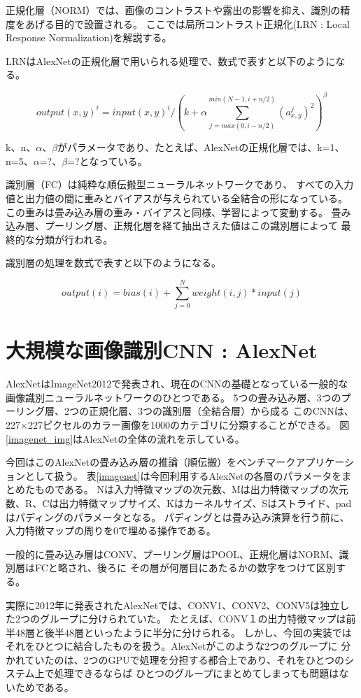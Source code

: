 正規化層（NORM）では、画像のコントラストや露出の影響を抑え、識別の精度をあげる目的で設置される。
ここでは局所コントラスト正規化(LRN : Local Response Normalization)を解説する。

LRNはAlexNetの正規化層で用いられる処理で、数式で表すと以下のようになる。

\[
  output(x, y)^{i} = input(x, y)^{i} / (k + \alpha \sum_{j=max(0, i-n/2)}^{min(N-1, i+n/2)} (a^j_{x, y})^2)^\beta
\]

k、n、$\alpha$、$\beta$がパラメータであり、たとえば、AlexNetの正規化層では、k=1、n=5、$\alpha$=?、$\beta$=?となっている。

識別層（FC）は純粋な順伝搬型ニューラルネットワークであり、
すべての入力値と出力値の間に重みとバイアスが与えられている全結合の形になっている。
この重みは畳み込み層の重み・バイアスと同様、学習によって変動する。
畳み込み層、プーリング層、正規化層を経て抽出さえた値はこの識別層によって
最終的な分類が行われる。

識別層の処理を数式で表すと以下のようになる。

\[
  output(i) = bias(i) + \sum_{j=0}^{N} weight(i, j) * input(j)
\]

\section{大規模な画像識別CNN : AlexNet}
AlexNet\cite{alexnet}はImageNet2012で発表され、現在のCNNの基礎となっている一般的な
画像識別ニューラルネットワークのひとつである。
5つの畳み込み層、3つのプーリング層、2つの正規化層、3つの識別層（全結合層）から成る
このCNNは、227×227ピクセルのカラー画像を1000のカテゴリに分類することができる。
図\ref{imagenet_img}はAlexNetの全体の流れを示している。

今回はこのAlexNetの畳み込み層の推論（順伝搬）をベンチマークアプリケーションとして扱う。
表\ref{imagenet}は今回利用するAlexNetの各層のパラメータをまとめたものである。
Nは入力特徴マップの次元数、Mは出力特徴マップの次元数、R、Cは出力特徴マップサイズ、Kはカーネルサイズ、Sはストライド、padはパディングのパラメータとなる。
パディングとは畳み込み演算を行う前に、入力特徴マップの周りを0で埋める操作である。

一般的に畳み込み層はCONV、プーリング層はPOOL、正規化層はNORM、識別層はFCと略され、後ろに
その層が何層目にあたるかの数字をつけて区別する。

実際に2012年に発表されたAlexNetでは、CONV1、CONV2、CONV5は独立した2つのグループに分けられていた。
たとえば、CONV１の出力特徴マップは前半48層と後半48層といったように半分に分けられる。
しかし、今回の実装ではそれをひとつに結合したものを扱う。AlexNetがこのような2つのグループに
分かれていたのは、2つのGPUで処理を分担する都合上であり、それをひとつのシステム上で処理できるならば
ひとつのグループにまとめてしまっても問題はないためである。

